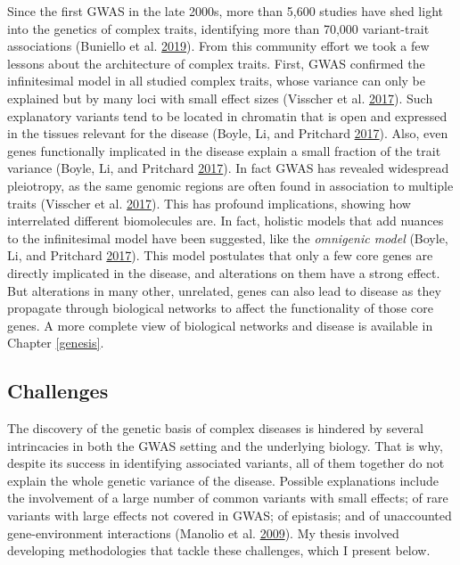\documentclass[
  11pt,
]{env/yjiao}
\begin{document}
Since the first GWAS in the late 2000s, more than 5,600 studies have shed light into the genetics of complex traits, identifying more than 70,000 variant-trait associations (Buniello et al. \protect\hyperlink{ref-buniello_nhgri-ebi_2019}{2019}). From this community effort we took a few lessons about the architecture of complex traits. First, GWAS confirmed the infinitesimal model in all studied complex traits, whose variance can only be explained but by many loci with small effect sizes (Visscher et al. \protect\hyperlink{ref-visscher_10_2017}{2017}). Such explanatory variants tend to be located in chromatin that is open and expressed in the tissues relevant for the disease (Boyle, Li, and Pritchard \protect\hyperlink{ref-boyle_expanded_2017}{2017}). Also, even genes functionally implicated in the disease explain a small fraction of the trait variance (Boyle, Li, and Pritchard \protect\hyperlink{ref-boyle_expanded_2017}{2017}). In fact GWAS has revealed widespread pleiotropy, as the same genomic regions are often found in association to multiple traits (Visscher et al. \protect\hyperlink{ref-visscher_10_2017}{2017}). This has profound implications, showing how interrelated different biomolecules are. In fact, holistic models that add nuances to the infinitesimal model have been suggested, like the \emph{omnigenic model} (Boyle, Li, and Pritchard \protect\hyperlink{ref-boyle_expanded_2017}{2017}). This model postulates that only a few core genes are directly implicated in the disease, and alterations on them have a strong effect. But alterations in many other, unrelated, genes can also lead to disease as they propagate through biological networks to affect the functionality of those core genes. A more complete view of biological networks and disease is available in Chapter \ref{genesis}.

\hypertarget{intro-gwas-challenges}{%
\subsection{Challenges}\label{intro-gwas-challenges}}

The discovery of the genetic basis of complex diseases is hindered by several intrincacies in both the GWAS setting and the underlying biology. That is why, despite its success in identifying associated variants, all of them together do not explain the whole genetic variance of the disease. Possible explanations include the involvement of a large number of common variants with small effects; of rare variants with large effects not covered in GWAS; of epistasis; and of unaccounted gene-environment interactions (Manolio et al. \protect\hyperlink{ref-manolio_finding_2009}{2009}). My thesis involved developing methodologies that tackle these challenges, which I present below.
\end{document}

